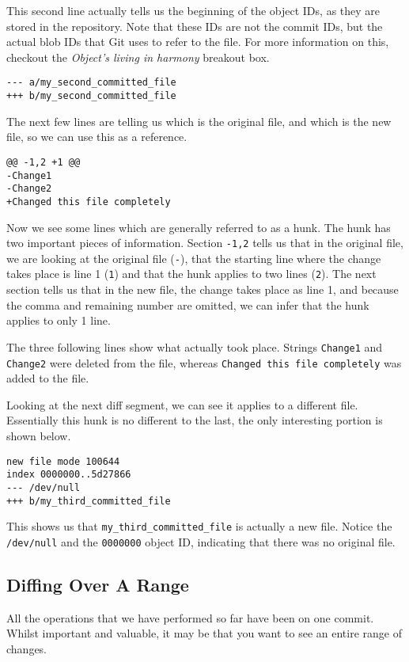 This second line actually tells us the beginning of the object IDs, as they are stored in the repository.  Note that these IDs are not the commit IDs, but the actual blob IDs that Git uses to refer to the file.  For more information on this, checkout the \emph{Object's living in harmony} breakout box.

\begin{Verbatim}
--- a/my_second_committed_file
+++ b/my_second_committed_file
\end{Verbatim}

The next few lines are telling us which is the original file, and which is the new file, so we can use this as a reference.

\begin{Verbatim}
@@ -1,2 +1 @@
-Change1
-Change2
+Changed this file completely
\end{Verbatim}

Now we see some lines which are generally referred to as a hunk.  The hunk has two important pieces of information.  Section \texttt{-1,2} tells us that in the original file, we are looking at the original file (\texttt{-}), that the starting line where the change takes place is line 1 (\texttt{1}) and that the hunk applies to two lines (\texttt{2}).  The next section tells us that in the new file, the change takes place as line 1, and because the comma and remaining number are omitted, we can infer that the hunk applies to only 1 line.

The three following lines show what actually took place.  Strings \texttt{Change1} and \texttt{Change2} were deleted from the file, whereas \texttt{Changed this file completely} was added to the file.

Looking at the next diff segment, we can see it applies to a different file.  Essentially this hunk is no different to the last, the only interesting portion is shown below.

\begin{Verbatim}
new file mode 100644
index 0000000..5d27866
--- /dev/null
+++ b/my_third_committed_file
\end{Verbatim}

This shows us that \texttt{my\_third\_committed\_file} is actually a new file.  Notice the \texttt{/dev/null} and the \texttt{0000000} object ID, indicating that there was no original file.

\subsection{Diffing Over A Range}
All the operations that we have performed so far have been on one commit.  Whilst important and valuable, it may be that you want to see an entire range of changes.  

